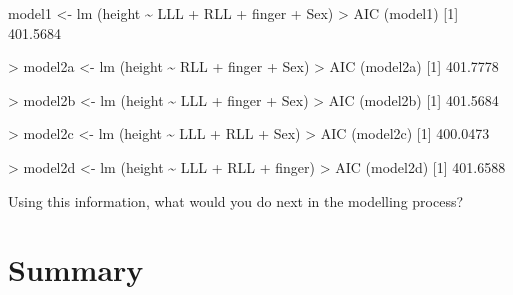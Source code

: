 \documentclass[
  oneside]{krantz}
\newenvironment{Shaded}{\begin{snugshade}}{\end{snugshade}}
\newcommand{\DecValTok}[1]{\textcolor[rgb]{0.00,0.00,0.81}{#1}}
\newcommand{\FloatTok}[1]{\textcolor[rgb]{0.00,0.00,0.81}{#1}}
\newcommand{\FunctionTok}[1]{\textcolor[rgb]{0.00,0.00,0.00}{#1}}
\newcommand{\NormalTok}[1]{#1}
\newcommand{\OtherTok}[1]{\textcolor[rgb]{0.56,0.35,0.01}{#1}}
\newcommand{\SpecialCharTok}[1]{\textcolor[rgb]{0.00,0.00,0.00}{#1}}
\begin{document}
\begin{Shaded}
\begin{Highlighting}[]
\NormalTok{model1 }\OtherTok{\textless{}{-}} \FunctionTok{lm}\NormalTok{ (height }\SpecialCharTok{\textasciitilde{}}\NormalTok{ LLL }\SpecialCharTok{+}\NormalTok{ RLL }\SpecialCharTok{+}\NormalTok{ finger }\SpecialCharTok{+}\NormalTok{ Sex)}
\SpecialCharTok{\textgreater{}} \FunctionTok{AIC}\NormalTok{ (model1)}
\NormalTok{[}\DecValTok{1}\NormalTok{] }\FloatTok{401.5684}

\SpecialCharTok{\textgreater{}}\NormalTok{ model2a }\OtherTok{\textless{}{-}} \FunctionTok{lm}\NormalTok{ (height }\SpecialCharTok{\textasciitilde{}}\NormalTok{ RLL }\SpecialCharTok{+}\NormalTok{ finger }\SpecialCharTok{+}\NormalTok{ Sex)}
\SpecialCharTok{\textgreater{}} \FunctionTok{AIC}\NormalTok{ (model2a)}
\NormalTok{[}\DecValTok{1}\NormalTok{] }\FloatTok{401.7778}

\SpecialCharTok{\textgreater{}}\NormalTok{ model2b }\OtherTok{\textless{}{-}} \FunctionTok{lm}\NormalTok{ (height }\SpecialCharTok{\textasciitilde{}}\NormalTok{ LLL }\SpecialCharTok{+}\NormalTok{ finger }\SpecialCharTok{+}\NormalTok{ Sex)}
\SpecialCharTok{\textgreater{}} \FunctionTok{AIC}\NormalTok{ (model2b)}
\NormalTok{[}\DecValTok{1}\NormalTok{] }\FloatTok{401.5684}

\SpecialCharTok{\textgreater{}}\NormalTok{ model2c }\OtherTok{\textless{}{-}} \FunctionTok{lm}\NormalTok{ (height }\SpecialCharTok{\textasciitilde{}}\NormalTok{ LLL }\SpecialCharTok{+}\NormalTok{ RLL }\SpecialCharTok{+}\NormalTok{ Sex)}
\SpecialCharTok{\textgreater{}} \FunctionTok{AIC}\NormalTok{ (model2c)}
\NormalTok{[}\DecValTok{1}\NormalTok{] }\FloatTok{400.0473}

\SpecialCharTok{\textgreater{}}\NormalTok{ model2d }\OtherTok{\textless{}{-}} \FunctionTok{lm}\NormalTok{ (height }\SpecialCharTok{\textasciitilde{}}\NormalTok{ LLL }\SpecialCharTok{+}\NormalTok{ RLL }\SpecialCharTok{+}\NormalTok{ finger)}
\SpecialCharTok{\textgreater{}} \FunctionTok{AIC}\NormalTok{ (model2d)}
\NormalTok{[}\DecValTok{1}\NormalTok{] }\FloatTok{401.6588}
\end{Highlighting}
\end{Shaded}

Using this information, what would you do next in the modelling process?

\hypertarget{SUMmodsel}{%
\section{Summary}\label{SUMmodsel}}
\end{document}
